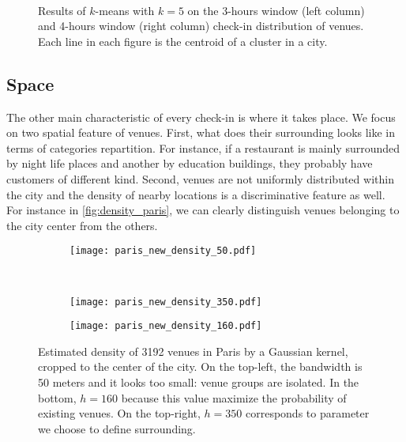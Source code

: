 \begin{figure}[p]
    \begin{subfigure}[b]{0.35\textwidth}
    \centering
    \iftoggle{EXTERNALPGF}{\texttt{[image: cluster\_day\_3h\_cl5]}}{}
    \end{subfigure}~
    \begin{subfigure}[b]{0.35\textwidth}
    \centering
    \iftoggle{EXTERNALPGF}{\texttt{[image: cluster\_day\_4h\_cl5]}}{}
    \end{subfigure}
    \caption[Venues cluster by time among all the cities]{
		Results of $k$-means with $k=5$ on the 3-hours window (left column) and 4-hours window (right column) check-in distribution of venues. 
Each line in each figure is the centroid of a cluster in a city.\label{fig:time_cluster_size}}
\end{figure}
\clearpage
\restoregeometry

\subsection{Space}

The other main characteristic of every check-in is where it takes place. We
focus on two spatial feature of venues. First, what does their surrounding looks
like in terms of categories repartition. For instance, if a restaurant is mainly
surrounded by night life places and another by education buildings, they
probably have customers of different kind. Second, venues are not uniformly
distributed within the city and the density of nearby locations is a
discriminative feature as well. For instance in \autoref{fig:density_paris}, we
can clearly distinguish venues belonging to the city center from the others.

\begin{figure}[h]
        \centering
    \begin{subfigure}[b]{0.25\textheight}
        \centering
        \texttt{[image: paris\_new\_density\_50.pdf]}
    \end{subfigure}~
    \begin{subfigure}[b]{0.25\textheight}
	\texttt{[image: paris\_new\_density\_350.pdf]}
    \end{subfigure}
    \begin{subfigure}[b]{0.25\textheight}
        \centering
	\texttt{[image: paris\_new\_density\_160.pdf]}
    \end{subfigure}
\caption[Venue density in Paris]{Estimated density of 3192 venues in Paris by
	a Gaussian kernel, cropped to the center of the city. On the top-left, the
	bandwidth is 50 meters and it looks too small: venue groups are isolated. In
	the bottom, $h=160$ because this value maximize the probability of
	existing venues. On the top-right, $h=350$ corresponds to parameter we
	choose to define surrounding. \label{fig:density_paris}}
\end{figure}

